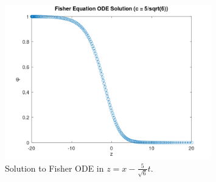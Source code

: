 \begin{solution}
    \begin{figure}[h]
        \centering
        \includegraphics[width=0.8\textwidth]{problem_2i.png}
        \caption{Solution to Fisher ODE in $z = x - \frac{5}{\sqrt{6}} t$.}
        \label{fig:problem_2i}
    \end{figure}
    \ \\
\end{solution}